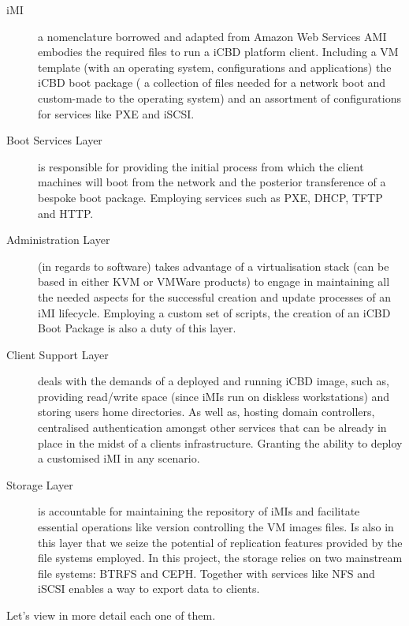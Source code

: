 \begin{description}
	\item [\acrfull{iMI}] a nomenclature borrowed and adapted from Amazon Web Services AMI~\cite{aws_ami} embodies the required files to run a iCBD platform client. Including a VM template (with an operating system, configurations and applications) the iCBD boot package ( a collection of files needed for a network boot and custom-made to the operating system) and an assortment of configurations for services like PXE and iSCSI.
	\item [Boot Services Layer] is responsible for providing the initial process from which the client machines will boot from the network and the posterior transference of a bespoke boot package. Employing services such as \acrshort{PXE}, \acrshort{DHCP}, \acrshort{TFTP} and \acrshort{HTTP}.
	\item [Administration Layer] (in regards to software) takes advantage of a virtualisation stack (can be based in either \acrshort{KVM} or VMWare products) to engage in maintaining all the needed aspects for the successful creation and update processes of an \acrshort{iMI} lifecycle.  Employing a custom set of scripts, the creation of an iCBD Boot Package is also a duty of this layer. 
	\item [Client Support Layer] deals with the demands of a deployed and running iCBD image, such as, providing read/write space (since iMIs run on diskless workstations) and storing users home directories. As well as, hosting domain controllers, centralised authentication amongst other services that can be already in place in the midst of a clients infrastructure. Granting the ability to deploy a customised iMI in any scenario.
	\item [Storage Layer] is accountable for maintaining the repository of iMIs and facilitate essential operations like version controlling the VM images files. Is also in this layer that we seize the potential of replication features provided by the file systems employed. In this project, the storage relies on two mainstream file systems: BTRFS and CEPH. Together with services like \acrshort{NFS} and \acrshort{iSCSI} enables a way to export data to clients.
\end{description}
 
Let's view in more detail each one of them.

